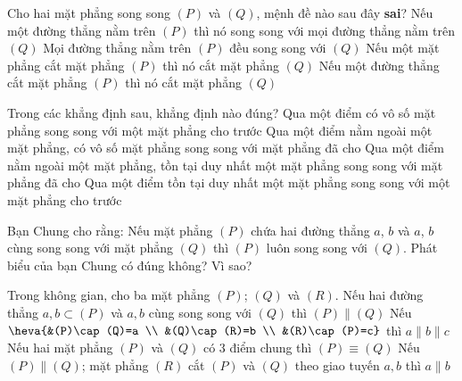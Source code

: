 \begin{ex}%
	Cho hai mặt phẳng song song $\left( P \right)$ và $\left( Q \right)$, mệnh đề nào sau đây \textbf{sai}? 
	\choice 
		{\True Nếu một đường thẳng nằm trên $\left(  P \right)$ thì nó song song với mọi đường thẳng nằm trên $\left( Q \right)$}
		{Mọi đường thẳng nằm trên  $\left( P \right)$ đều song song với $\left( Q \right)$}
		{Nếu một mặt phẳng cắt mặt phẳng $\left( P \right)$ thì nó cắt mặt phẳng $\left( Q  \right)$}
		{Nếu một đường thẳng cắt mặt phẳng $\left( P \right)$ thì nó  cắt mặt phẳng $\left( Q \right)$}
\end{ex}

\begin{ex}%
	Trong các  khẳng định sau, khẳng định nào đúng?
	 \choice
		{ Qua một điểm có vô số mặt phẳng  song song với một mặt phẳng cho trước}
		{ Qua một điểm nằm ngoài một  mặt phẳng, có vô số mặt phẳng song song với mặt phẳng đã cho}
		{\True Qua một điểm nằm ngoài một mặt phẳng, tồn tại duy nhất một mặt phẳng song song với mặt  phẳng đã cho}
		{Qua một điểm tồn tại duy nhất  một mặt phẳng song song với một mặt phẳng cho trước}
\end{ex}

\begin{ex}%
	Bạn Chung cho rằng: Nếu mặt phẳng $(P)$  chứa hai đường thẳng $a$, $b$ và $a$, $b$ cùng song song với mặt phẳng $(Q)$ thì $(P)$ luôn song song với $(Q)$. Phát biểu của bạn Chung có đúng không? Vì sao?
\end{ex}


\begin{ex}%
 Trong không gian, cho ba mặt phẳng $(P)$; $(Q)$  và $(R)$.
  \choiceTF
  {Nếu hai đường thẳng $a, b\subset (P)$ và $a, b$ cùng song song  với $(Q)$ thì $(P)\parallel (Q)$}
  {Nếu $\heva{&(P)\cap (Q)=a \\ &(Q)\cap (R)=b \\ &(R)\cap (P)=c}$ thì $a\parallel b\parallel c$} 
  {Nếu hai mặt phẳng $(P)$ và $(Q)$ có $3$ điểm chung thì $(P)\equiv (Q)$} 
  {\True Nếu $(P)\parallel (Q)$; mặt phẳng $(R)$ cắt $(P)$ và $(Q)$ theo giao tuyến $a, b$ thì $a\parallel b$} 
 \loigiai{} 
\end{ex}

